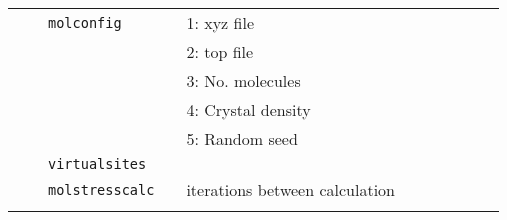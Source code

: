 \documentclass[11pt]{article}
\begin{document}
\begin{center}
\begin{tabular}{cclclcccccc}
	  $\mbox{}$ && \verb!molconfig!&& 1: \textsf{xyz} file && && \\
			  &&                 && 2: \textsf{top} file && && \\
			  &&                 && 3: No. molecules && && \\
			  &&                 && 4: Crystal density && && \\
			  &&                 && 5: Random seed && && \\
			  &&\verb!virtualsites!&& && && \\
	  $\mbox{}$ &&\verb!molstresscalc! && iterations between calculation && && \\ 
	  && && && && \\
    \hline                                           
  \end{tabular}

\end{center}
\end{document}
